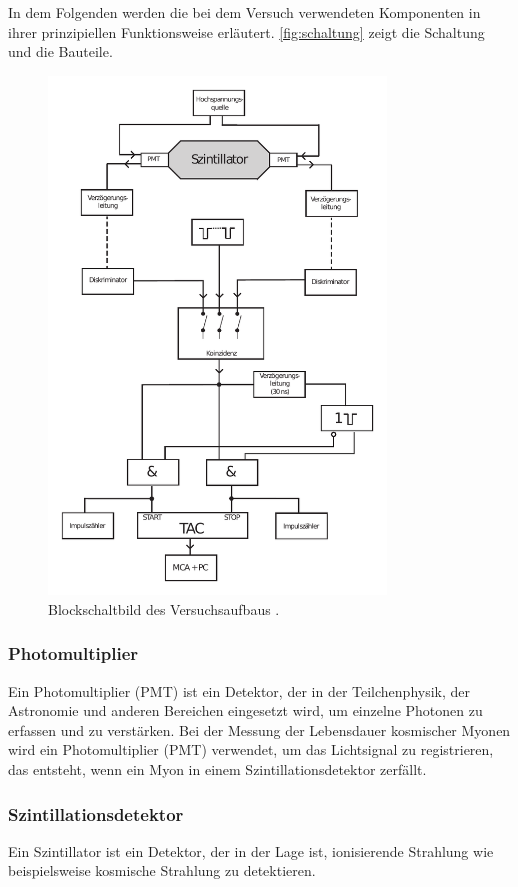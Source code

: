 In dem Folgenden werden die bei dem Versuch verwendeten Komponenten in ihrer prinzipiellen Funktionsweise erläutert.
\autoref{fig:schaltung} zeigt die Schaltung und die Bauteile.
\begin{figure}
    \centering
    \includegraphics[width=0.8\textwidth]{pictures/schaltung.pdf}
    \caption{Blockschaltbild des Versuchsaufbaus \cite[3]{v01}.}
    \label{fig:schaltung}
\end{figure}


\subsubsection*{Photomultiplier}
Ein Photomultiplier (PMT) ist ein Detektor, der in der Teilchenphysik, 
der Astronomie und anderen Bereichen eingesetzt wird, um einzelne Photonen zu erfassen und zu verstärken. 
Bei der Messung der Lebensdauer kosmischer Myonen wird ein Photomultiplier (PMT) verwendet, 
um das Lichtsignal zu registrieren, das entsteht, 
wenn ein Myon in einem Szintillationsdetektor zerfällt. 

\subsubsection*{Szintillationsdetektor}
Ein Szintillator ist ein Detektor, der in der Lage ist, 
ionisierende Strahlung wie beispielsweise kosmische Strahlung zu detektieren. 

